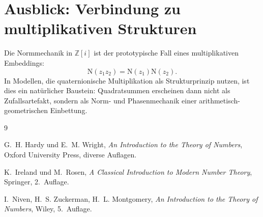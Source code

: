 \documentclass[a4paper,11pt]{article}
\theoremstyle{definition}
\theoremstyle{remark}
\newcommand{\Zi}{\mathbb{Z}[i]}
\newcommand{\Norm}{\mathrm{N}}
\begin{document}
	\section{Ausblick: Verbindung zu multiplikativen Strukturen}
	Die Normmechanik in \(\Zi\) ist der prototypische Fall eines multiplikativen Embeddings:
	\[
	\Norm(z_1z_2)=\Norm(z_1)\Norm(z_2).
	\]
	In Modellen, die quaternionische Multiplikation als Strukturprinzip nutzen, ist dies ein natürlicher Baustein:
	Quadratsummen erscheinen dann nicht als Zufallsartefakt, sondern als Norm- und Phasenmechanik einer
	arithmetisch-geometrischen Einbettung.
	
	\begin{thebibliography}{9}
		
		G.~H. Hardy und E.~M. Wright,
		\textit{An Introduction to the Theory of Numbers},
		Oxford University Press, diverse Auflagen.
		
		K.~Ireland und M.~Rosen,
		\textit{A Classical Introduction to Modern Number Theory},
		Springer, 2.\ Auflage.
		
		I.~Niven, H.~S. Zuckerman, H.~L. Montgomery,
		\textit{An Introduction to the Theory of Numbers},
		Wiley, 5.\ Auflage.
		
	\end{thebibliography}
	
\end{document}
